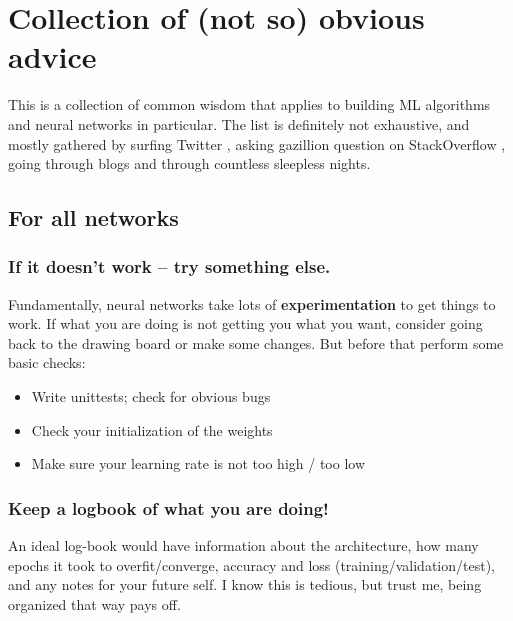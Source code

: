 \section{Collection of (not so) obvious advice}
\label{sec:advice}

This is a collection of common wisdom that applies to building ML algorithms and neural networks in particular.
The list is definitely not exhaustive, and mostly gathered by surfing Twitter \cite{twitter:karpathy:nn:300618}, asking gazillion question on StackOverflow \cite{se:stats:sycorax:nn-no-learn}, going through blogs \cite{byu:pcc:advice} and through countless sleepless nights.

\subsection{For all networks}

\subsubsection*{If it doesn't work -- try something else.}
Fundamentally, neural networks take lots of {\bf experimentation} to get things to work.
If what you are doing is not getting you what you want, consider going back to the drawing board or make some changes.
But before that perform some basic checks:
\begin{itemize}
\item Write unittests; check for obvious bugs
\item Check your initialization of the weights
\item Make sure your learning rate is not too high / too low
\end{itemize}

\subsubsection*{Keep a logbook of what you are doing!}

An ideal log-book would have information about the architecture, how many epochs it took to overfit/converge, accuracy and loss (training/validation/test), and any notes for your future self.
I know this is tedious, but trust me, being organized that way pays off.

